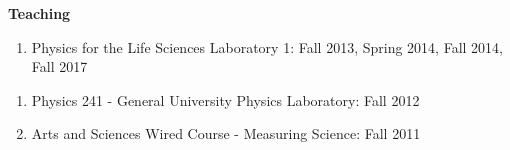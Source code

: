 \documentclass[11pt]{article}
\makeatletter
\newcommand{\specialcell}[2][l]{%
  \begin{tabular}[#1]{@{}l@{}}#2\end{tabular}}
\makeatother
\begin{document}
\vspace{7pt}
\begin{flushleft}
\LARGE\textbf{Teaching} \\
\normalsize 
\vspace{-4pt}

\begin{description}[style=nextline]
	\item [University of Michigan] \hfill
		\vspace{-0.5cm}
		\begin{enumerate}
			\item Physics for the Life Sciences Laboratory 1: Fall 2013, Spring 2014, Fall 2014, Fall 2017
			
		\end{enumerate}
	\item [University of Kentucky] \hfill
		\vspace{-0.5cm}
		\begin{enumerate}
			\item Physics 241 - General University Physics Laboratory: Fall 2012
			\item Arts and Sciences Wired Course - Measuring Science: Fall 2011
		\end{enumerate}
\end{description}




\end{flushleft}












\end{document}
